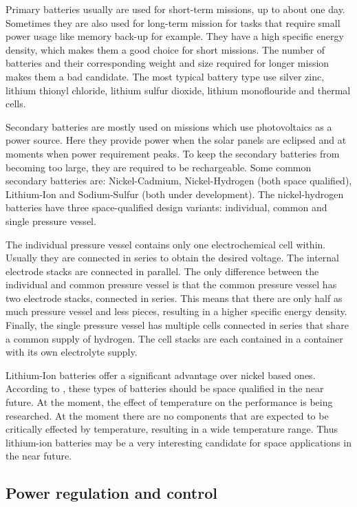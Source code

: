 Primary batteries usually are used for short-term missions, up to about one day. Sometimes they are also used for long-term mission for tasks that require small power usage like memory back-up for example. They have a high specific energy density, which makes them a good choice for short missions. The number of batteries and their corresponding weight and size required for longer mission makes them a bad candidate. The most typical battery type use silver zinc, lithium thionyl chloride, lithium sulfur dioxide, lithium monoflouride and thermal cells.

Secondary batteries are mostly used on missions which use photovoltaics as a power source. Here they provide power when the solar panels are eclipsed and at moments when power requirement peaks. To keep the secondary batteries from becoming too large, they are required to be rechargeable. Some common secondary batteries are: Nickel-Cadmium, Nickel-Hydrogen (both space qualified), Lithium-Ion and Sodium-Sulfur (both under development). The nickel-hydrogen batteries have three space-qualified design variants: individual, common and single pressure vessel.

The individual pressure vessel contains only one electrochemical cell within. Usually they are connected in series to obtain the desired voltage.
The internal electrode stacks are connected in parallel.
The only difference between the individual and common pressure vessel is that the common pressure vessel has two electrode stacks, connected in series. This means that there are only half as much pressure vessel and less pieces, resulting in a higher specific energy density. 
Finally, the single pressure vessel has multiple cells connected in series that share a common supply of hydrogen. The cell stacks are each contained in a container with its own electrolyte supply\cite{larson}. 

Lithium-Ion batteries offer a significant advantage over nickel based ones. According to \cite{larson}, these types of batteries should be space qualified in the near future. At the moment, the effect of temperature on the performance is being researched. At the moment there are no components that are expected to be critically effected by temperature, resulting in a wide temperature range. Thus lithium-ion batteries may be a very interesting candidate for space applications in the near future\cite{lithium1}.

\subsection{Power regulation and control}
\label{blDOregulation}

